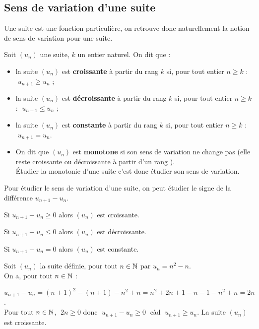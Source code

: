 \subsection{Sens de variation d'une suite}
Une suite est une fonction particulière, on retrouve donc naturellement la notion de sens de variation pour une suite.

\begin{definition} Soit $(u_{n})$ une suite, $ k $ un entier naturel. On dit que :
\begin{itemize}
\item[\textbullet] la suite $(u_{n})$   est  \textbf{croissante}  à partir du rang $ k $ si, pour tout entier  $ n \geq k $ :  $ \; u_{n+1}\geq u_{n} $ ;
\item[\textbullet]la suite $(u_{n})$   est   \textbf{décroissante} à partir du rang $ k $ si, pour tout entier  $ n \geq  k $ :  $ \;u_{n+1}\leq u_{n}$ ;
\item[\textbullet] la suite $(u_{n})$  est   \textbf{constante} à partir du rang $ k $  si, pour tout entier $ n\geq k $ :  $ \;u_{n+1}= u_{n}$.\\

 \item[\textbullet] On dit que $(u_{n})$ est  \textbf{monotone}  si son sens
de variation ne change pas (elle reste croissante  ou décroissante  à partir d'un rang ).\\
Étudier la monotonie d'une suite c'est donc étudier son sens de  variation.
\end{itemize}
\end{definition}

\bigskip
\begin{methode}

 Pour étudier le sens de variation d'une suite, on peut étudier le signe de la différence   $  u_{n+1}- u_{n} $.

Si $ u_{n+1}- u_{n}\geq 0 $ alors $(u_{n})$ est croissante.

Si $ u_{n+1}- u_{n}\leq 0 $ alors $(u_{n})$ est décroissante.

Si $ u_{n+1}- u_{n}=0 $ alors $(u_{n})$ est constante.
\end{methode}

\begin{example} 
 Soit $(u_{n})$ la suite définie, pour tout $ n\in\mathbb{N} $ par $ u_{n} = n^{2} -n $.  \\ On a, pour tout $ n\in\mathbb{N} $ :

 $ u_{n+1}- u_{n} = (n +1)^{2} -(n +1)-n^{2} +n = n^{2} +2n +1-n -1-n^{2} +n = 2n$.\\
Pour tout $ n\in\mathbb{N} $, $\; 2n \geq 0  $ donc   $\; u_{n+1}- u_{n}\geq 0\; $  càd  $ \;u_{n+1}\geq u_{n} $.\;  
La suite  $(u_{n})$  est croissante.
\end{example}

